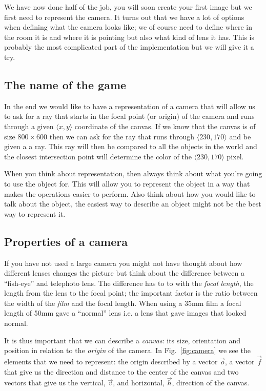\documentclass[a4paper,11pt]{article}
\begin{document}
We have now done half of the job, you will soon create your first
image but we first need to represent the camera. It turns out that we
have a lot of options when defining what the camera looks like; we of
course need to define where in the room it is and where it is pointing
but also what kind of lens it has. This is probably the most
complicated part of the implementation but we will give it a try.

\subsection*{The name of the game}
In the end we would like to have a representation of a camera that
will allow us to ask for a ray that starts in the focal point (or
origin) of the camera and runs through a given $\langle x, y\rangle$
coordinate of the canvas. If we know that the canvas is of size
$800 \times 600$
then we can ask for the ray that runs through
$\langle 230, 170\rangle$
and be given a a ray. This ray will then be compared to all the
objects in the world and the closest intersection point will determine
the color of the $\langle 230, 170\rangle$ pixel.

When you think about representation, then always think about what
you're going to use the object for. This will allow you to represent
the object in a way that makes the operations easier to perform. Also
think about how you would like to talk about the object, the easiest
way to describe an object might not be the best way to represent it.

\subsection*{Properties of a camera}
If you have not used a large camera you might not have thought about
how different lenses changes the picture but think about the
difference between a ``fish-eye'' and telephoto lens. The difference
has to to with the {\em focal length}, the length from the lens to the
focal point; the important factor is the ratio between the width of
the {\em film} and the focal length. When using a 35mm film a focal
length of 50mm gave a ``normal'' lens i.e. a lens that gave images
that looked normal.

It is thus important that we can describe a {\em canvas}: its size,
orientation and position in relation to the {\em origin} of the
camera. In Fig.~\ref{fig:camera} we see the elements that we need to
represent: the origin described by a vector $\vec{o}$,
a vector $\vec{f}$
that give us the direction and distance to the center of the canvas
and two vectors that give us the vertical, $\vec{v}$,
and horizontal, $\vec{h}$,
direction of the canvas. 
\end{document}

